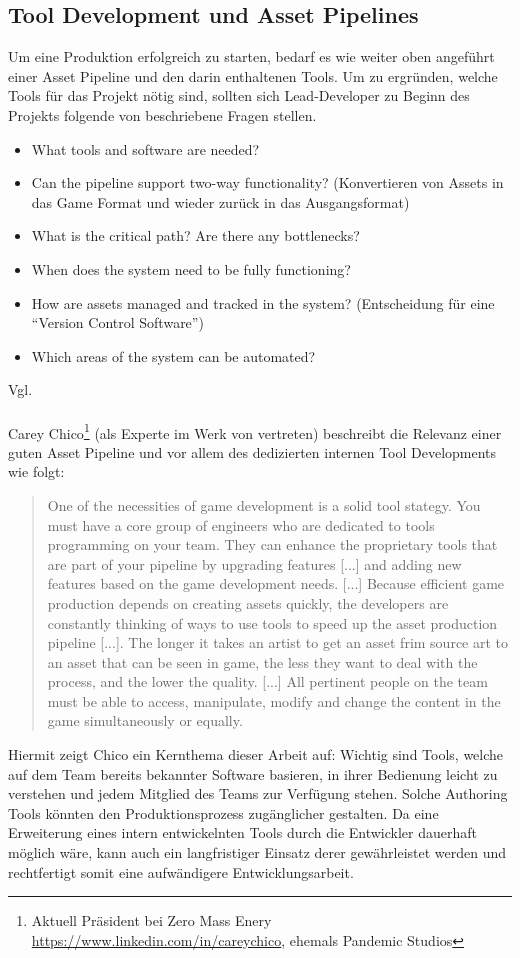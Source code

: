 \documentclass[pagesize, paper=a4, fontsize=12pt,titlepage=true, headings=small, headnosepline, abstractoff, liststotoc, nochapterprefix, plainheadsepline, twoside]{scrreprt}
\begin{document}
\subsection {Tool Development und Asset Pipelines}
Um eine Produktion erfolgreich zu starten, bedarf es wie weiter oben angeführt einer Asset Pipeline und den darin enthaltenen Tools. Um zu ergründen, welche Tools für das Projekt nötig sind, sollten sich Lead-Developer zu Beginn des Projekts folgende von \cite{Chandler2006} beschriebene Fragen stellen.
\begin{itemize}
\item What tools and software are needed?
\item Can the pipeline support two-way functionality? (Konvertieren von Assets in das Game Format und wieder zurück in das Ausgangsformat)
\item What is the critical path? Are there any bottlenecks?
\item When does the system need to be fully functioning?
\item How are assets managed and tracked in the system? (Entscheidung für eine “Version Control Software”)
\item Which areas of the system can be automated?
\end{itemize} Vgl. \autocite[S. 224-225]{Chandler2006}
\\
\\
Carey Chico\footnote{Aktuell Präsident bei Zero Mass Enery \url{https://www.linkedin.com/in/careychico}, ehemals Pandemic Studios} (als Experte im Werk von \cite{Chandler2006} vertreten) beschreibt die Relevanz einer guten Asset Pipeline und vor allem des dedizierten internen Tool Developments wie folgt:
\begin{quote}
One of the necessities of game development is a solid tool stategy. You must have a core group of engineers who are dedicated to tools programming on your team. They can enhance the proprietary tools that are part of your pipeline by upgrading features [...] and adding new features based on the game development needs. [...] Because efficient game production depends on creating assets quickly, the developers are constantly thinking of ways to use tools to speed up the asset production pipeline [...]. The longer it takes an artist to get an asset frim source art to an asset that can be seen in game, the less they want to deal with the process, and the lower the quality.
[...]
All pertinent people on the team must be able to access, manipulate, modify and change the content in the game simultaneously or equally.
\autocite[S. 224-225]{Chandler2006}
\end{quote}
Hiermit zeigt Chico ein Kernthema dieser Arbeit auf: Wichtig sind Tools, welche auf dem Team bereits bekannter Software basieren, in ihrer Bedienung leicht zu verstehen und jedem Mitglied des Teams zur Verfügung stehen. Solche Authoring Tools könnten den Produktionsprozess zugänglicher gestalten. Da eine Erweiterung eines intern entwickelnten Tools durch die Entwickler dauerhaft möglich wäre, kann auch ein langfristiger Einsatz derer gewährleistet werden und rechtfertigt somit eine aufwändigere Entwicklungsarbeit.
\end{document}
